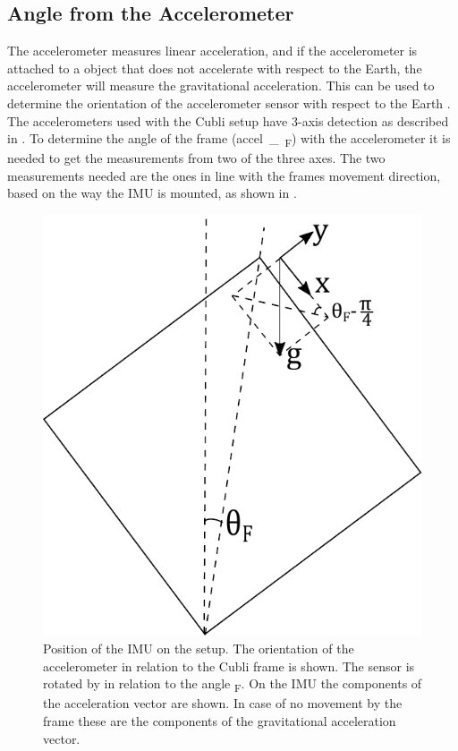\subsection{Angle from the Accelerometer}
The accelerometer measures linear acceleration, and if the accelerometer is attached to a object that does not accelerate with respect to the Earth, the accelerometer will measure the gravitational acceleration. This can be used to determine the orientation of the accelerometer sensor with respect to the Earth \cite{JWarren}.\\
The accelerometers used with the Cubli setup have 3-axis detection as described in . To determine the angle of the frame (\si{accel\_\theta_{F}}) with the accelerometer it is needed to get the measurements from two of the three axes. The two measurements needed are the ones in line with the frames movement direction, based on the way the IMU is mounted, as shown in . 
\begin{figure}[H]
	\centering
	\includegraphics[scale=0.58]{figures/accelerometer}
	\caption{Position of the IMU on the setup. The orientation of the accelerometer in relation to the Cubli frame is shown. The sensor is rotated by \si{} in relation to the angle \si{\theta_F}. On the IMU the components of the acceleration vector are shown. In case of no movement by the frame these are the components of the gravitational acceleration vector.}
	\label{accelerometer}
\end{figure}\vspace{-5mm}
